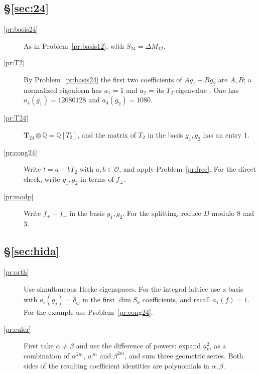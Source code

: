 \documentclass[reqno]{amsart}
\theoremstyle{definition}
\theoremstyle{plain}
\newcommand{\Q}{\mathbb{Q}}
\newcommand{\Oc}{\mathcal{O}}
\newcommand{\T}{\mathbf{T}}
\begin{document}
\subsection*{\S\ref{sec:24}}
\begin{description}
\item[\ref{pr:basis24}] As in Problem~\ref{pr:basis12}, with \(S_{24} = \Delta M_{12}\).
\item[\ref{pr:T2}] By Problem~\ref{pr:basis24} the first two coefficients of \(A g_1 + B g_2\) are \(A, B\); a normalized eigenform has \(a_1 = 1\) and \(a_2\) = its \(T_2\)-eigenvalue \cite[Ch.~VII, \S5.4]{SeA}.  One has \(a_4(g_1) = 12080128\) and \(a_4(g_2) = 1080\).
\item[\ref{pr:T24}] \(\T_{24} \otimes \Q = \Q[T_2]\), and the matrix of \(T_2\) in the basis \(g_1, g_2\) has an entry \(1\).
\item[\ref{pr:cong24}] Write \(t = a + bT_2\) with \(a, b \in \Oc\), and apply Problem~\ref{pr:free}.  For the direct check, write \(g_1, g_2\) in terms of \(f_\pm\).
\item[\ref{pr:modp}] Write \(f_+ - f_-\) in the basis \(g_1, g_2\).  For the splitting, reduce \(D\) modulo \(8\) and \(3\).
\end{description}

\subsection*{\S\ref{sec:hida}}
\begin{description}
\item[\ref{pr:orth}] Use simultaneous Hecke eigenspaces.  For the integral lattice use a basis with \(a_i(g_j)=\delta_{ij}\) in the first \(\dim S_k\) coefficients, and recall \(a_1(f)=1\).  For the example use Problem~\ref{pr:cong24}.
\item[\ref{pr:euler}] First take \(\alpha\ne\beta\) and use the difference of powers: expand \(a_m^2\) as a combination of \(\alpha^{2m}\), \(w^m\) and \(\beta^{2m}\), and sum three geometric series.  Both sides of the resulting coefficient identities are polynomials in \(\alpha,\beta\).
\end{description}
\end{document}
